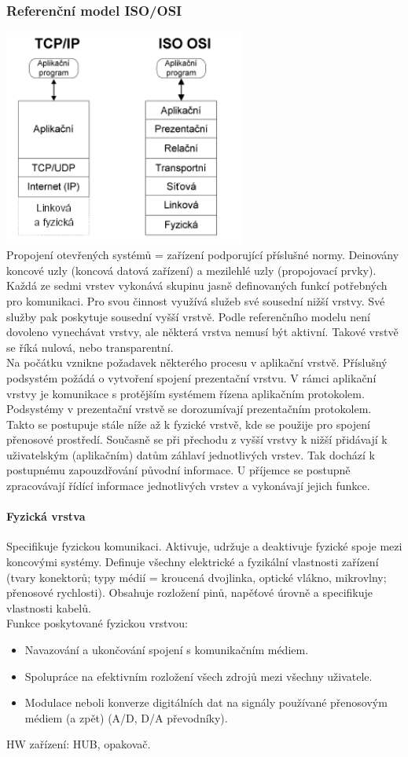 \documentclass[10pt,a4paper]{article}
\begin{document}
\subsubsection{Referenční model ISO/OSI}
\includegraphics[width=8cm]{img/modely.png} \\
Propojení otevřených systémů = zařízení podporující příslušné normy. Deinovány koncové uzly (koncová datová zařízení) a mezilehlé uzly (propojovací prvky). \\
Každá ze sedmi vrstev vykonává skupinu jasně definovaných funkcí potřebných pro komunikaci. Pro svou činnost využívá služeb své sousední nižší vrstvy. Své služby pak poskytuje sousední vyšší vrstvě. Podle referenčního modelu není dovoleno vynechávat vrstvy, ale některá vrstva nemusí být aktivní. Takové vrstvě se říká nulová, nebo transparentní. \\
Na počátku vznikne požadavek některého procesu v aplikační vrstvě. Příslušný podsystém požádá o vytvoření spojení prezentační vrstvu. V rámci aplikační vrstvy je komunikace s protějším systémem řízena aplikačním protokolem. Podsystémy v prezentační vrstvě se dorozumívají prezentačním protokolem. Takto se postupuje stále níže až k fyzické vrstvě, kde se použije pro spojení přenosové prostředí. Současně se při přechodu z vyšší vrstvy k nižší přidávají k uživatelským (aplikačním) datům záhlaví jednotlivých vrstev. Tak dochází k postupnému zapouzdřování původní informace. U příjemce se postupně zpracovávají řídící informace jednotlivých vrstev a vykonávají jejich funkce.
\paragraph{Fyzická vrstva} Specifikuje fyzickou komunikaci. Aktivuje, udržuje a deaktivuje fyzické spoje mezi koncovými systémy. Definuje všechny elektrické a fyzikální vlastnosti zařízení (tvary konektorů; typy médií = kroucená dvojlinka, optické vlákno, mikrovlny; přenosové rychlosti). Obsahuje rozložení pinů, napěťové úrovně a specifikuje vlastnosti kabelů. \\
Funkce poskytované fyzickou vrstvou:
\begin{itemize}
	\item Navazování a ukončování spojení s komunikačním médiem.
	\item Spolupráce na efektivním rozložení všech zdrojů mezi všechny uživatele.
	\item Modulace neboli konverze digitálních dat na signály používané přenosovým médiem (a zpět) (A/D, D/A převodníky).
\end{itemize}
HW zařízení: HUB, opakovač.
\end{document}
